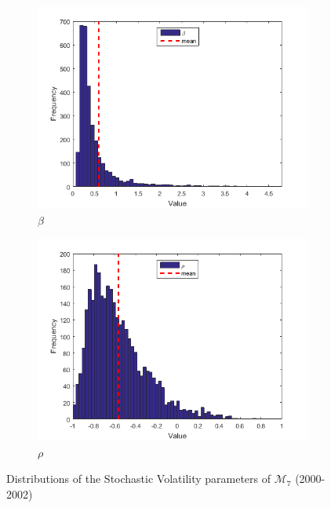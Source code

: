\documentclass[11pt,a4,twosided,singlespacing,titlepagenumber=on]{scrreprt}
\numberwithin{equation}{chapter} %
\theoremstyle{remark}
\begin{document}
\begin{figure}[H]
\begin{subfigure}[t]{0.32\textwidth}
        \includegraphics[width=1\textwidth]{res/params/3653_4384/5}
        \caption{$\beta$}
    \end{subfigure}
    \begin{subfigure}[t]{0.32\textwidth}
        \centering
        \includegraphics[width=1\textwidth]{res/params/3653_4384/6}
        \caption{$\rho$}
    \end{subfigure}
    \caption[]{Distributions of the Stochastic Volatility parameters of $\mathcal{M}_7$ (2000-2002)}
    \label{fig:param_dists_2000_2002}
\end{figure}
\end{document}
